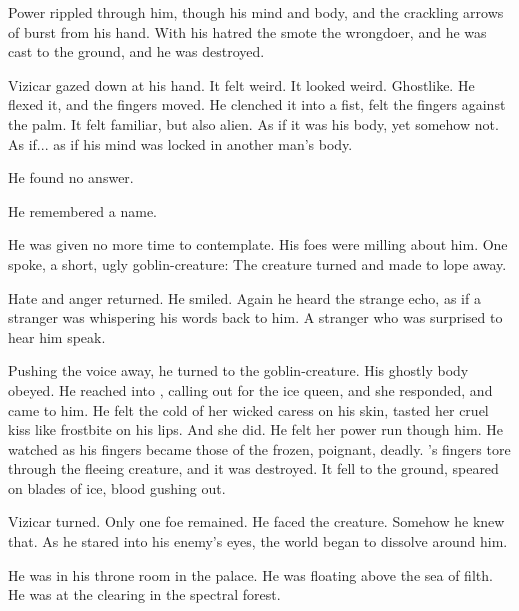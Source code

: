 Power rippled through him, though his mind and body, and the crackling arrows of \Nyxachel{} burst from his hand. With his hatred the \Qliphah{} smote the wrongdoer, and he was cast to the ground, and he was destroyed. 

Vizicar gazed down at his hand. It felt weird. It looked weird. Ghostlike. He flexed it, and the fingers moved. He clenched it into a fist, felt the fingers against the palm. It felt familiar, but also alien. As if it was his body, yet somehow not. As if... as if his mind was locked in another man's body. 

 He found no answer. 

He remembered a name. 


He was given no more time to contemplate. His foes were milling about him. One spoke, a short, ugly goblin-creature: 
 The creature turned and made to lope away. 

Hate and anger returned. He smiled. 
Again he heard the strange echo, as if a stranger was whispering his words back to him. A stranger who was surprised to hear him speak. 

Pushing the voice away, he turned to the goblin-creature. His ghostly body obeyed. %
\ta{\Horvaleth!} He reached into \nieur{}, calling out for the ice queen, and she responded, and came to him. He felt the cold of her wicked caress on his skin, tasted her cruel kiss like frostbite on his lips.  And she did. He felt her power run though him. He watched as his fingers became those of the \Qliphah\dash frozen, poignant, deadly. \Horvaleth's fingers tore through the fleeing creature, and it was destroyed. It fell to the ground, speared on blades of ice, blood gushing out. 

Vizicar turned. Only one foe remained. He faced the creature.  Somehow he knew that.  As he stared into his enemy's eyes, the world began to dissolve around him. 


He was in his throne room in the palace. He was floating above the sea of filth. He was at the clearing in the spectral forest. 

